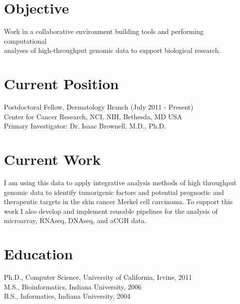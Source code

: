 \documentclass[margin,line]{res}
\begin{document}

\address{\textbf{E-mail:} kenny@kennydaily.net \textbf{Web:} www.kennydaily.net}
\address{10301 Grosvenor Place Apt 703, North Bethesda, MD 20852}

\begin{resume}


\section{Objective}
Work in a collaborative environment building tools and performing computational\\
analyses of high-throughput genomic data to support biological research.

\section{Current Position}
Postdoctoral Fellow, Dermatology Branch  (July 2011 - Present)\\
Center for Cancer Research, NCI, NIH, Bethesda, MD USA \\
Primary Investigator: Dr. Isaac Brownell, M.D., Ph.D.

\section{Current Work}
I am using this data to apply integrative analysis methods of high throughput genomic data to identify tumorigenic factors and potential prognostic and therapeutic targets in the skin cancer Merkel cell carcinoma.
To support this work I also develop and implement reusable pipelines for the analysis of microarray, RNAseq, DNAseq, and aCGH data.

\section{Education}
Ph.D., Computer Science, University of California, Irvine, 2011\\%
M.S., Bioinformatics, Indiana University, 2006\\%
B.S., Informatics, Indiana University, 2004%


\end{resume}
\end{document}
